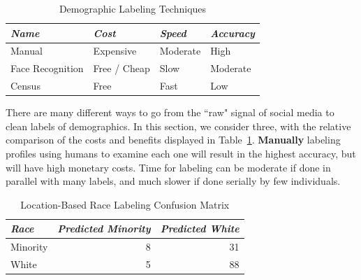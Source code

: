 \begin{table}[h]
\centering
\begin{tabular}{l l l l}
\emph{Name} & \emph{Cost} & \emph{Speed} & \emph{Accuracy} \\ \hline
Manual & Expensive & Moderate & High \\ 
Face Recognition & Free / Cheap & Slow & Moderate \\ 
Census & Free & Fast & Low \\ 
\end{tabular}
\caption{Demographic Labeling Techniques \label{tab:techniques}}
\end{table}

There are many different ways to go from the ``raw" signal of social media to clean labels of demographics.
In this section, we consider three, with the relative comparison of the costs and benefits displayed in Table~\ref{tab:techniques}.
\textbf{Manually} labeling profiles using humans to examine each one will result in the highest accuracy, but will have high monetary costs.
Time for labeling can be moderate if done in parallel with many labels, and much slower if done serially by few individuals. 

\begin{table}[h]
\centering
\label{tab:cm_race_loc}
\begin{tabular}{l r r}
\emph{Race} & \emph{Predicted Minority} & \emph{Predicted White} \\ \hline
Minority & 8 & 31 \\
White & 5 & 88 \\
\end{tabular}
\caption{Location-Based Race Labeling Confusion Matrix}
\end{table}

